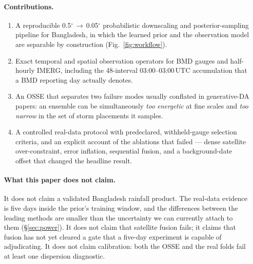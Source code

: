 \documentclass[10pt,twocolumn]{article}
\begin{document}
\paragraph{Contributions.}
\begin{enumerate}[label=(\arabic{enumi})]
\item A reproducible 0.5$^\circ$\,$\rightarrow$\,0.05$^\circ$ probabilistic
downscaling and posterior-sampling pipeline for Bangladesh, in which the
learned prior and the observation model are separable by construction
(Fig.~\ref{fig:workflow}).
\item Exact temporal and spatial observation operators for BMD gauges and
half-hourly IMERG, including the 48-interval 03:00--03:00\,UTC accumulation
that a BMD reporting day actually denotes.
\item An OSSE that separates two failure modes usually conflated in
generative-DA papers: an ensemble can be simultaneously \emph{too energetic}
at fine scales and \emph{too narrow} in the set of storm placements it samples.
\item A controlled real-data protocol with predeclared, withheld-gauge
selection criteria, and an explicit account of the ablations that failed ---
dense satellite over-constraint, error inflation, sequential fusion, and a
background-date offset that changed the headline result.
\end{enumerate}

\paragraph{What this paper does not claim.}
It does not claim a validated Bangladesh rainfall product. The real-data
evidence is five days inside the prior's training window, and the differences
between the leading methods are smaller than the uncertainty we can currently
attach to them (\S\ref{sec:power}). It does not claim that satellite fusion
fails; it claims that fusion has not yet cleared a gate that a five-day
experiment is capable of adjudicating. It does not claim calibration: both the
OSSE and the real folds fail at least one dispersion diagnostic.
\end{document}
